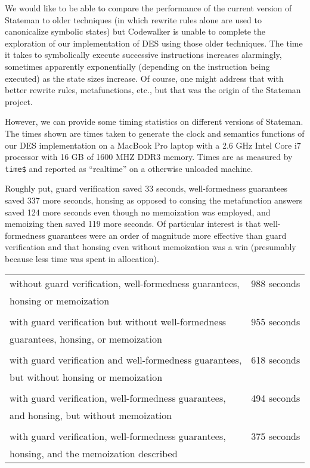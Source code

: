 \documentclass[submission,copyright,creativecommons]{eptcs}
\newcommand{\ptt}[1]{\tt{#1}}
\begin{document}
We would like to be able to compare the performance of the current version of
Stateman to older techniques (in which rewrite rules alone are used to
canonicalize symbolic states) but Codewalker is unable to complete the
exploration of our implementation of DES using those older techniques.  The
time it takes to symbolically execute successive instructions increases
alarmingly, sometimes apparently exponentially (depending on the instruction
being executed) as the state sizes increase.  Of course, one might address
that with better rewrite rules, metafunctions, etc., but that was the origin
of the Stateman project.

However, we can provide some timing statistics on different versions of
Stateman.  The times shown are times taken to generate the clock and
semantics functions of our DES implementation on a MacBook Pro laptop with a
2.6 GHz Intel Core i7 processor with 16 GB of 1600 MHZ DDR3 memory.
Times are as measured by {\ptt{time\$}} and reported as ``realtime'' on a
otherwise unloaded machine.

Roughly put, guard verification saved 33 seconds, well-formedness guarantees
saved 337 more seconds, honsing as opposed to consing the metafunction
answers saved 124 more seconds even though no memoization was employed, and
memoizing then saved 119 more seconds.  Of particular interest is that
well-formedness guarantees were an order of magnitude more effective than
guard verification and that honsing even without memoization was a win
(presumably because less time was spent in allocation).

\vspace*{1em}

\begin{tabular}{ll}
without guard verification, well-formedness guarantees, & 988 seconds \\
honsing or memoization & \\
\\
with guard verification but without well-formedness & 955 seconds \\
guarantees, honsing, or memoization & \\
\\
with guard verification and well-formedness guarantees, & 618 seconds \\
but without honsing or memoization & \\
\\
with guard verification, well-formedness guarantees, & 494 seconds \\
and honsing, but without memoization & \\
\\
with guard verification, well-formedness guarantees, & 375 seconds \\
honsing, and the memoization described & \\
\end{tabular}
\end{document}
